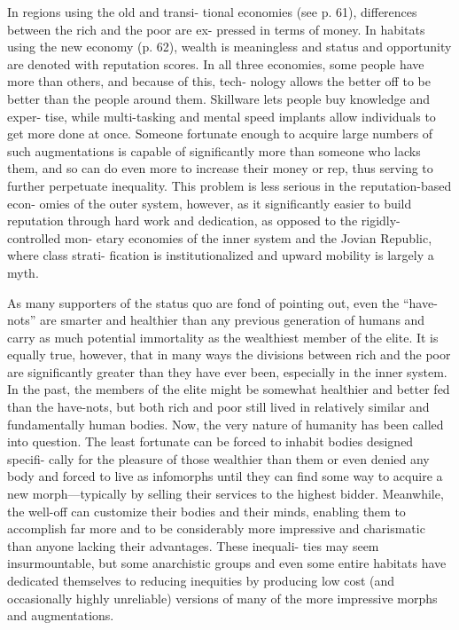 In regions using the old and transi-
tional economies (see p. 61), differences 
between the rich and the poor are ex-
pressed in terms of money. In habitats 
using the new economy (p. 62), wealth is 
meaningless and status and opportunity 
are denoted with reputation scores. In all 
three economies, some people have more 
than others, and because of this, tech-
nology allows the better off to be better 
than the people around them. Skillware 
lets people buy knowledge and exper-
tise, while multi-tasking and mental 
speed implants allow individuals to get 
more done at once. Someone fortunate 
enough to acquire large numbers of such 
augmentations is capable of significantly 
more than someone who lacks them, and 
so can do even more to increase their 
money or rep, thus serving to further 
perpetuate inequality. This problem is 
less serious in the reputation-based econ-
omies of the outer system, however, as 
it significantly easier to build reputation 
through hard work and dedication, as 
opposed to the rigidly-controlled mon-
etary economies of the inner system and 
the Jovian Republic, where class strati-
fication is institutionalized and upward 
mobility is largely a myth.

As many supporters of the status quo 
are fond of pointing out, even the ``have-
nots'' are smarter and healthier than 
any previous generation of humans and 
carry as much potential immortality as 
the wealthiest member of the elite. It is 
equally true, however, that in many ways 
the divisions between rich and the poor 
are significantly greater than they have 
ever been, especially in the inner system. 
In the past, the members of the elite 
might be somewhat healthier and better 
fed than the have-nots, but both rich and 
poor still lived in relatively similar and 
fundamentally human bodies. Now, the 
very nature of humanity has been called 
into question. The least fortunate can be 
forced to inhabit bodies designed specifi-
cally for the pleasure of those wealthier 
than them or even denied any body and 
forced to live as infomorphs until they 
can find some way to acquire a new 
morph—typically by selling their services 
to the highest bidder. Meanwhile, the 
well-off can customize their bodies and 
their minds, enabling them to accomplish 
far more and to be considerably more 
impressive and charismatic than anyone 
lacking their advantages. These inequali-
ties may seem insurmountable, but some 
anarchistic groups and even some entire 
habitats have dedicated themselves to 
reducing inequities by producing low 
cost (and occasionally highly unreliable) 
versions of many of the more impressive 
morphs and augmentations.


